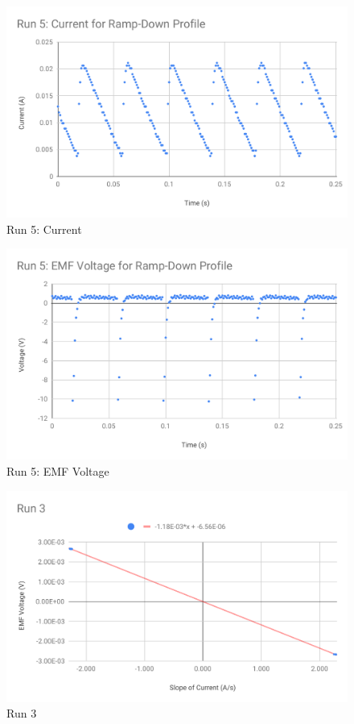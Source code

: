 %
\begin{figure}[ht]
	\centering
	\includegraphics[scale=0.74]{image/04-faraday/run-5-I.pdf}
	\caption{Run 5: Current}
	\label{figure.04.run.5.I}
\end{figure}
%
\begin{figure}[ht]
	\centering
	\includegraphics[scale=0.74]{image/04-faraday/run-5-V.pdf}
	\caption{Run 5: EMF Voltage}
	\label{figure.04.run.5.V}
\end{figure}
%
\begin{figure}[ht]
	\centering
	\includegraphics[scale=0.74]{image/04-faraday/run-3.pdf}
	\caption{Run 3}
	\label{figure.04.run.3}
\end{figure}